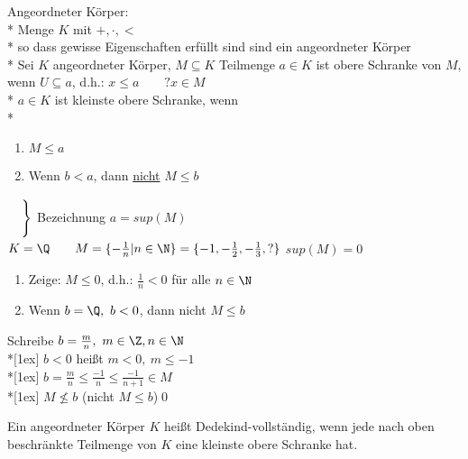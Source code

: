 \wdh
Angeordneter Körper:\\*
Menge $K$ mit $+, ·, <$\\*
so dass gewisse Eigenschaften erfüllt sind
\bsp
\Q{} sind ein angeordneter Körper\\*
Sei $K$ angeordneter Körper, $M\subseteq K$ Teilmenge $a\in K$ ist obere Schranke von $M$, wenn $U\subseteq a$, d.h.: $x\leq a\qquad ?x\in M$\\*
$a\in K$ ist kleinste obere Schranke, wenn\\*
\begin{enumerate}
\item{$M\leq a$}
\item{Wenn $b < a$, dann \ul{nicht} $M\leq b$}
\end{enumerate}
\vspace*{-9.5ex}\hspace*{15.5em}
$\left.
\begin{array}{l}
{}\vspace*{2ex}\\*{}
\end{array}
\right\}$
\vspace*{-5ex}Bezeichnung $a=sup(M)$
\vspace*{5ex}
%
\bsp
$K=\Q\qquad M=\{-\frac{1}{n}|n\in\N\}=\{-1,-\frac{1}{2},-\frac{1}{3},?\}$
$sup(M)=0$
\bew
\begin{enumerate}
\item {Zeige: $M \leq 0$, d.h.: $\frac{1}{n}<0$ für alle $n\in\N$\ok}
\item {Wenn $b=\Q,\ b<0$, dann nicht $M\leq b$}
\end{enumerate}
Schreibe $b=\frac{m}{n},\ m\in\Z, n\in\N$\\*[1ex]
$b<0$ heißt $m<0,\ m\leq -1$\\*[1ex]
$b=\frac{m}{n} \leq \frac{-1}{n} \leq \frac{-1}{n+1}\in M$\\*[1ex]
\Rarr{} $M\not\leq b$ (nicht $M\leq b$)\qed

Ein angeordneter Körper $K$ heißt Dedekind-vollständig, wenn jede nach oben beschränkte Teilmenge von $K$ eine kleinste obere Schranke hat.

